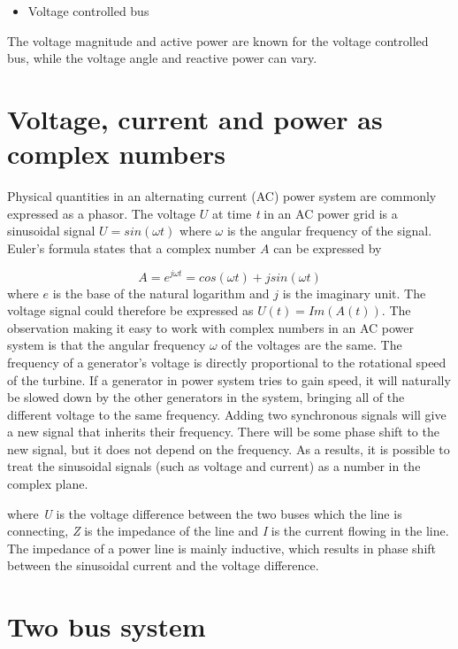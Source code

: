 \documentclass[class=book, crop=false]{standalone}
\begin{document}
\begin{itemize}
  \item Voltage controlled bus
\end{itemize}
The voltage magnitude and active power are known for the voltage controlled bus, while the voltage angle and reactive power can vary.

\section{Voltage, current and power as complex numbers}
Physical quantities in an alternating current (AC) power system are commonly expressed as a phasor. The voltage $U$ at time \textit{t} in an AC power grid is a sinusoidal signal $U = sin(\omega t)$ where $\omega$ is the angular frequency of the signal. Euler's formula states that a complex number $A$ can be expressed by

\begin{equation}\label{eq:eulers_equation}
    A = e^{j\omega t} = cos(\omega t) + jsin(\omega t)
\end{equation}
where $e$ is the base of the natural logarithm and $j$ is the imaginary unit. The voltage signal could therefore be expressed as $U(t) = Im(A(t))$. The observation making it easy to work with complex numbers in an AC power system is that the angular frequency $\omega$ of the voltages are the same. The frequency of a generator's voltage is directly proportional to the rotational speed of the turbine. If a generator in power system tries to gain speed, it will naturally be slowed down by the other generators in the system, bringing all of the different voltage to the same frequency. Adding two synchronous signals will give a new signal that inherits their frequency. There will be some phase shift to the new signal, but it does not depend on the frequency. As a results, it is possible to treat the sinusoidal signals (such as voltage and current) as a number in the complex plane.  

where \textit{U} is the voltage difference between the two buses which the line is connecting, \textit{Z} is the impedance of the line and \textit{I} is the current flowing in the line. The impedance of a power line is mainly inductive, which results in phase shift between the sinusoidal  current and the voltage difference. 

\section{Two bus system}
\end{document}
